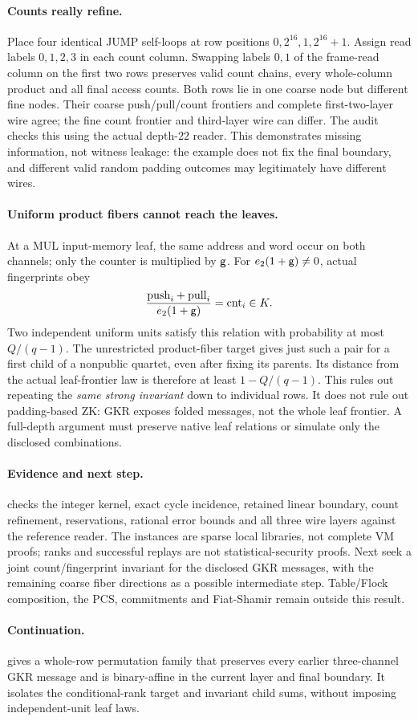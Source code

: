 \paragraph{Counts really refine.} Place four identical JUMP self-loops at row positions $0,2^{16},1,2^{16}+1$. Assign read labels $0,1,2,3$ in each count column. Swapping labels $0,1$ of the frame-read column on the first two rows preserves valid count chains, every whole-column product and all final access counts. Both rows lie in one coarse node but different fine nodes. Their coarse push/pull/count frontiers and complete first-two-layer wire agree; the fine count frontier and third-layer wire can differ. The audit checks this using the actual depth-$22$ reader. This demonstrates missing information, not witness leakage: the example does not fix the final boundary, and different valid random padding outcomes may legitimately have different wires.

\paragraph{Uniform product fibers cannot reach the leaves.} At a MUL input-memory leaf, the same address and word occur on both channels; only the counter is multiplied by $\mathsf{g}$. For $e_2(1+\mathsf{g})\ne0$, actual fingerprints obey
\[
 \frac{\mathrm{push}_i+\mathrm{pull}_i}{e_2(1+\mathsf{g})}=\mathrm{cnt}_i\in K.
\]
Two independent uniform units satisfy this relation with probability at most $Q/(q-1)$. The unrestricted product-fiber target gives just such a pair for a first child of a nonpublic quartet, even after fixing its parents. Its distance from the actual leaf-frontier law is therefore at least $1-Q/(q-1)$. This rules out repeating the \emph{same strong invariant} down to individual rows. It does not rule out padding-based ZK: GKR exposes folded messages, not the whole leaf frontier. A full-depth argument must preserve native leaf relations or simulate only the disclosed combinations.

\paragraph{Evidence and next step.}  checks the integer kernel, exact cycle incidence, retained linear boundary, count refinement, reservations, rational error bounds and all three wire layers against the reference reader. The instances are sparse local libraries, not complete VM proofs; ranks and successful replays are not statistical-security proofs. Next seek a joint count/fingerprint invariant for the disclosed GKR messages, with the remaining coarse fiber directions as a possible intermediate step. Table/Flock composition, the PCS, commitments and Fiat-Shamir remain outside this result.

\paragraph{Continuation.}  gives a whole-row permutation family that preserves every earlier three-channel GKR message and is binary-affine in the current layer and final boundary. It isolates the conditional-rank target and invariant child sums, without imposing independent-unit leaf laws.
